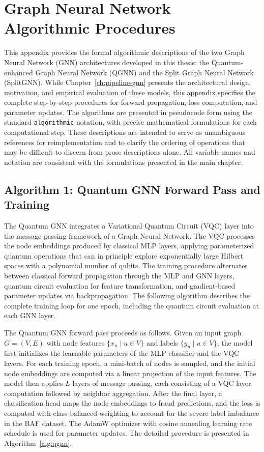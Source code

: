 \chapter{Graph Neural Network Algorithmic Procedures}
\label{app:gnn-algorithms}

This appendix provides the formal algorithmic descriptions of the two Graph Neural Network (GNN) architectures developed in this thesis: the Quantum-enhanced Graph Neural Network (QGNN) and the Split Graph Neural Network (SplitGNN). While Chapter~\ref{ch:pipeline-gnn} presents the architectural design, motivation, and empirical evaluation of these models, this appendix specifies the complete step-by-step procedures for forward propagation, loss computation, and parameter updates. The algorithms are presented in pseudocode form using the standard \texttt{algorithmic} notation, with precise mathematical formulations for each computational step. These descriptions are intended to serve as unambiguous references for reimplementation and to clarify the ordering of operations that may be difficult to discern from prose descriptions alone. All variable names and notation are consistent with the formulations presented in the main chapter.

\section{Algorithm 1: Quantum GNN Forward Pass and Training}
\label{app:qgnn-algorithm}

The Quantum GNN integrates a Variational Quantum Circuit (VQC) layer into the message-passing framework of a Graph Neural Network. The VQC processes the node embeddings produced by classical MLP layers, applying parameterized quantum operations that can in principle explore exponentially large Hilbert spaces with a polynomial number of qubits. The training procedure alternates between classical forward propagation through the MLP and GNN layers, quantum circuit evaluation for feature transformation, and gradient-based parameter updates via backpropagation. The following algorithm describes the complete training loop for one epoch, including the quantum circuit evaluation at each GNN layer.

The Quantum GNN forward pass proceeds as follows. Given an input graph $G = (V, E)$ with node features $\{x_u \mid u \in V\}$ and labels $\{y_u \mid u \in V\}$, the model first initializes the learnable parameters of the MLP classifier and the VQC layers. For each training epoch, a mini-batch of nodes is sampled, and the initial node embeddings are computed via a linear projection of the input features. The model then applies $L$ layers of message passing, each consisting of a VQC layer computation followed by neighbor aggregation. After the final layer, a classification head maps the node embeddings to fraud predictions, and the loss is computed with class-balanced weighting to account for the severe label imbalance in the BAF dataset. The AdamW optimizer with cosine annealing learning rate schedule is used for parameter updates. The detailed procedure is presented in Algorithm~\ref{alg:qgnn}.

